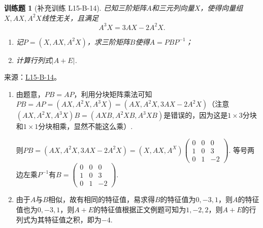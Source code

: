 \documentclass[UTF8,12pt,a4paper,fontset=fandol]{ctexart}
\newtheorem{exercise}{训练题}[section]
\begin{document}
\begin{exercise}[补充训练 L15-B-14]\label{prob:L15-B-14}
已知三阶矩阵$A$和三元列向量$X$，使得向量组$X,AX,A^2X$线性无关，且满足
        \[A^3X=3AX-2A^2X.\]
        \begin{enumerate}
            \item 记$P=(X,AX,A^2X)$，求三阶矩阵$B$使得$A=PBP^{-1}$；

            \item 计算行列式$|A+E|$.
        \end{enumerate}
\end{exercise}
\noindent 来源：\href{https://github.com/yhwu-is/Linear-Algebra-Left-Undone/blob/new/%E8%AE%B2%E4%B9%89/%E4%B8%93%E9%A2%98/15%20%E7%9B%B8%E4%BC%BC%E6%A0%87%E5%87%86%E5%BD%A2%EF%BC%9A%E5%A4%8D%E6%95%B0%E5%9F%9F%E4%B8%8A%E7%9A%84%E5%B0%9D%E8%AF%95%E4%B8%8E%E7%90%86%E8%AE%BA.tex}{L15-B-14}。
\begin{solve}
\begin{enumerate}
              \item 由题意，$PB=AP$，利用分块矩阵乘法可知$PB=AP=(AX,A^2X,A^3X)=(AX,A^2X,3AX-2A^2X)$（注意$(AX,A^2X,A^3X)B=(AXB,A^2XB,A^3XB)$是错误的，因为这是$1\times 3$分块和$1\times 1$分块相乘，显然不能这么乘）.

                    则$PB=(AX,A^2X,3AX-2A^2X)=(X,AX,A^X)\begin{pmatrix}
                            0 & 0 & 0 \\ 1 & 0 & 3 \\ 0 & 1 & -2
                        \end{pmatrix}$. 等号两边左乘$P^{-1}$有$B=\begin{pmatrix}
                            0 & 0 & 0 \\ 1 & 0 & 3 \\ 0 & 1 & -2
                        \end{pmatrix}$.

              \item 由于$A$与$B$相似，故有相同的特征值，易求得$B$的特征值为$0,-3,1$，则$A$的特征值也为$0,-3,1$，则$A+E$的特征值根据正文例题可知为$1,-2,2$，则$A+E$的行列式为其特征值之积，即为$-4$.
          \end{enumerate}
\end{solve}
\end{document}
